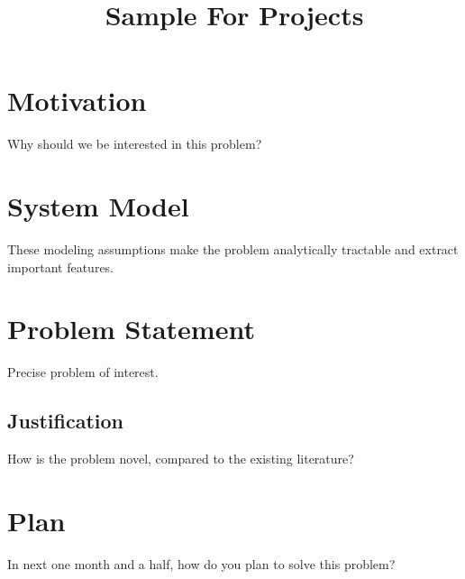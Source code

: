 \documentclass[a4paper,english,12pt]{article}
\title{Sample For Projects}
\author{}
\begin{document}
\maketitle

\section{Motivation}
Why should we be interested in this problem?
\section{System Model}
These modeling assumptions make the problem analytically tractable and extract important features.
\section{Problem Statement}
Precise problem of interest.
\subsection{Justification}
How is the problem novel, compared to the existing literature?
\section{Plan}
In next one month and a half, how do you plan to solve this problem?
\end{document}
